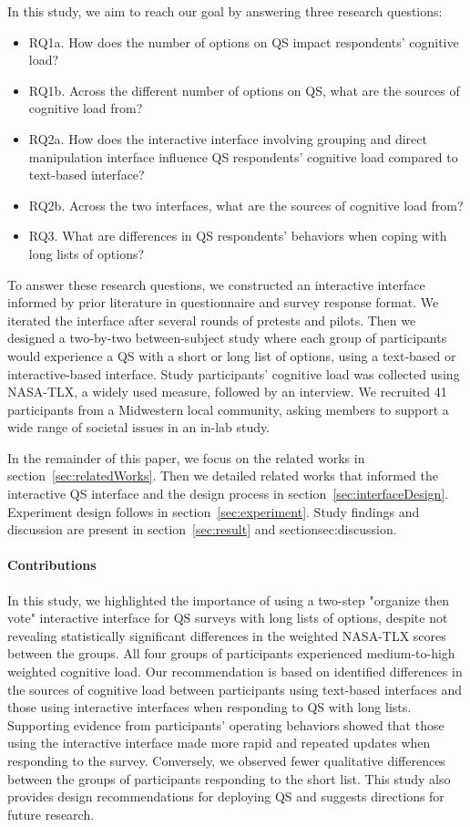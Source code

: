 In this study, we aim to reach our goal by answering three research questions:
\begin{itemize}
\item RQ1a. How does the number of options on QS impact respondents' cognitive load?
\item RQ1b. Across the different number of options on QS, what are the sources of cognitive load from?
\item RQ2a. How does the interactive interface involving grouping and direct manipulation interface influence QS respondents' cognitive load compared to text-based interface?
\item RQ2b. Across the two interfaces, what are the sources of cognitive load from?
\item RQ3. What are differences in QS respondents' behaviors when coping with long lists of options?
\end{itemize}

To answer these research questions, we constructed an interactive interface informed by prior literature in questionnaire and survey response format. We iterated the interface after several rounds of pretests and pilots. Then we designed a two-by-two between-subject study where each group of participants would experience a QS with a short or long list of options, using a text-based or interactive-based interface. Study participants' cognitive load was collected using NASA-TLX, a widely used measure, followed by an interview. We recruited 41 participants from a Midwestern local community, asking members to support a wide range of societal issues in an in-lab study.

In the remainder of this paper, we focus on the related works in section~\ref{sec:relatedWorks}. Then we detailed related works that informed the interactive QS interface and the design process in section~\ref{sec:interfaceDesign}. Experiment design follows in section~\ref{sec:experiment}. Study findings and discussion are present in section~\ref{sec:result} and section{sec:discussion}.

\paragraph*{Contributions}
In this study, we highlighted the importance of using a two-step "organize then vote" interactive interface for QS surveys with long lists of options, despite not revealing statistically significant differences in the weighted NASA-TLX scores between the groups. All four groups of participants experienced medium-to-high weighted cognitive load. Our recommendation is based on identified differences in the sources of cognitive load between participants using text-based interfaces and those using interactive interfaces when responding to QS with long lists. Supporting evidence from participants' operating behaviors showed that those using the interactive interface made more rapid and repeated updates when responding to the survey. Conversely, we observed fewer qualitative differences between the groups of participants responding to the short list. This study also provides design recommendations for deploying QS and suggests directions for future research.

